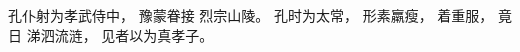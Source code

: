 
\switchcolumn*[\section{}]

孔仆射为孝武侍中，
豫蒙眷接
烈宗山陵。
孔时为太常，
形素羸瘦，
着重服，
竟日
涕泗流涟，
见者以为真孝子。

\switchcolumn



